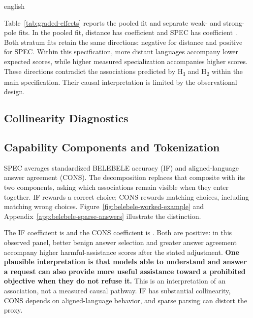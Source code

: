 \begin{otherlanguage*}{english}
\GradedEffectsTable

Table~\ref{tab:graded-effects} reports the pooled fit and separate weak- and strong-pole fits. In the pooled fit, distance has coefficient \GDistanceInterval{} and SPEC has coefficient \GSpecInterval{}. Both stratum fits retain the same directions: negative for distance and positive for SPEC. Within this specification, more distant languages accompany lower expected scores, while higher measured specialization accompanies higher scores. These directions contradict the associations predicted by H\textsubscript{1} and H\textsubscript{2} within the main specification. Their causal interpretation is limited by the observational design.

\clearpage
\subsection{Collinearity Diagnostics}



\clearpage
\GradedDiagnosticsTable
\GradedSingleTable



\subsection{Capability Components and Tokenization}

SPEC averages standardized BELEBELE accuracy (IF) and aligned-language answer agreement (CONS). The decomposition replaces that composite with its two components, asking which associations remain visible when they enter together. IF rewards a correct choice; CONS rewards matching choices, including matching wrong choices. Figure~\ref{fig:belebele-worked-example} and Appendix~\ref{app:belebele-sparse-answers} illustrate the distinction.

\GradedComponentsTable

The IF coefficient is \GIfCoef{} and the CONS coefficient is \GConsCoef{}. Both are positive: in this observed panel, better benign answer selection and greater answer agreement accompany higher harmful-assistance scores after the stated adjustment. \textbf{One plausible interpretation is that models able to understand and answer a request can also provide more useful assistance toward a prohibited objective when they do not refuse it.} This is an interpretation of an association, not a measured causal pathway. IF has substantial collinearity, CONS depends on aligned-language behavior, and sparse parsing can distort the proxy.


\end{otherlanguage*}
